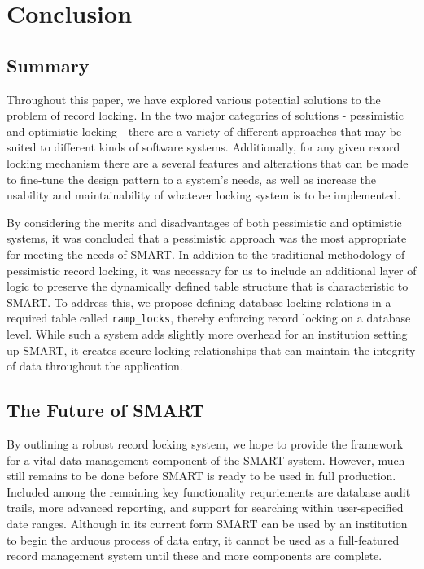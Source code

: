 \documentclass[12pt]{article}
\newcommand{\code}[1]{\texttt{#1}}
\begin{document}
\newpage
\section{Conclusion}

\subsection{Summary}
Throughout this paper, we have explored various potential solutions to the problem of record locking. In the two major categories of solutions - pessimistic and optimistic locking - there are a variety of different approaches that may be suited to different kinds of software systems. Additionally, for any given record locking mechanism there are a several features and alterations that can be made to fine-tune the design pattern to a system’s needs, as well as increase the usability and maintainability of whatever locking system is to be implemented.

By considering the merits and disadvantages of both pessimistic and optimistic systems, it was concluded that a pessimistic approach was the most appropriate for meeting the needs of SMART. In addition to the traditional methodology of pessimistic record locking, it was necessary for us to include an additional layer of logic to preserve the dynamically defined table structure that is characteristic to SMART. To address this, we propose defining database locking relations in a required table called \code{ramp\_locks}, thereby enforcing record locking on a database level. While such a system adds slightly more overhead for an institution setting up SMART, it creates secure locking relationships that can maintain the integrity of data throughout the application.

\subsection{The Future of SMART}
By outlining a robust record locking system, we hope to provide the framework for a vital data management component of the SMART system. However, much still remains to be done before SMART is ready to be used in full production. Included among the remaining key functionality requriements are database audit trails, more advanced reporting, and support for searching within user-specified date ranges. Although in its current form SMART can be used by an institution to begin the arduous process of data entry, it cannot be used as a full-featured record management system until these and more components are complete.
\end{document}
